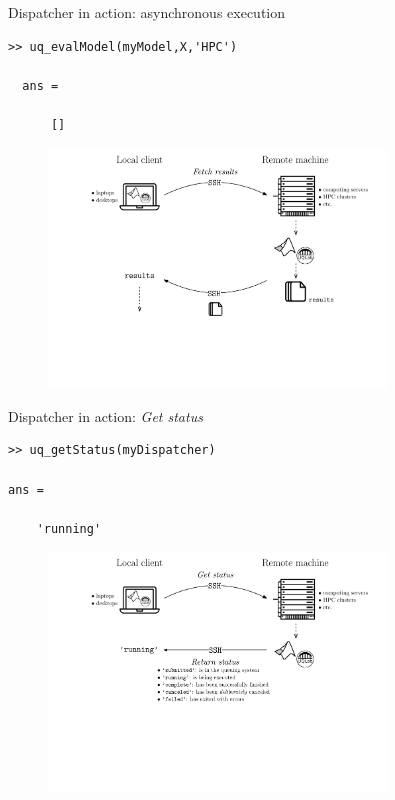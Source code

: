 \documentclass[]{rsuqbeamernew}
\begin{document}
\begin{frame}[fragile]{Dispatcher in action: asynchronous execution}

  \begin{lstlisting}[basicstyle=\scriptsize,numbers=none]
  >> uq_evalModel(myModel,X,'HPC')
      
  ans =
  
      []
  \end{lstlisting}
      
  \begin{figure}[htbp]    
    \centering
    \includegraphics[width= 0.8\textwidth]{./figures/dispatch-and-fetch-fetchResults.pdf}
  \end{figure}
    
  \end{frame}

\begin{frame}[fragile]{Dispatcher in action: \emph{Get status}}

\begin{lstlisting}[basicstyle=\scriptsize,numbers=none]
>> uq_getStatus(myDispatcher)
      
ans =

    'running'
\end{lstlisting}
      
\begin{figure}[htbp]    
  \centering
  \includegraphics[width= 0.8\textwidth]{./figures/dispatch-and-fetch-getStatus.pdf}
\end{figure}
    
\end{frame}
\end{document}
